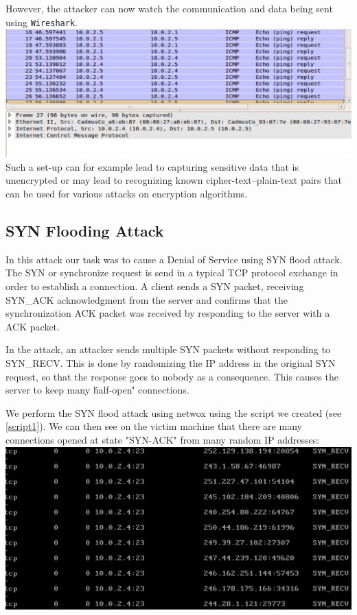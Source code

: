 \documentclass[12pt, a4paper, pdflatex]{article}
\begin{document}
However, the attacker can now watch the communication and data being sent using \texttt{Wireshark}.\\

\includegraphics[width=.95\textwidth]{gfx/imcp-shark}\\

Such a set-up can for example lead to capturing sensitive data that is unencrypted or may lead to recognizing known cipher-text--plain-text pairs that can be used for various attacks on encryption algorithms.

\subsection{SYN Flooding Attack}

In this attack our task was to cause a Denial of Service using SYN flood attack. The SYN or synchronize request is send in a typical TCP protocol exchange in order to establish a connection. A client sends a SYN packet, receiving SYN\_ACK acknowledgment from the server and confirms that the synchronization ACK packet was received by responding to the server with a ACK packet.

In the attack, an attacker sends multiple SYN packets without responding to SYN\_RECV. This is done by randomizing the IP address in the original SYN request, so that the response goes to nobody as a consequence. This causes the server to keep many \'half-open\'' connections.

We perform the SYN flood attack using netwox using the script we created (see \ref{script1}). We can then see on the victim machine that there are many connections opened at state "SYN-ACK" from many random IP addresses:\\
\includegraphics[width=.95\textwidth]{gfx/syn-netstat.png}
\end{document}
